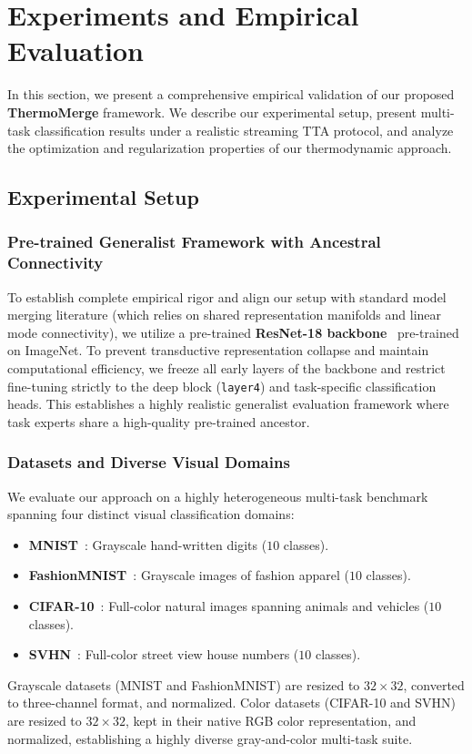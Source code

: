 \section{Experiments and Empirical Evaluation}
\label{sec:experiments}

In this section, we present a comprehensive empirical validation of our proposed \textbf{ThermoMerge} framework. We describe our experimental setup, present multi-task classification results under a realistic streaming TTA protocol, and analyze the optimization and regularization properties of our thermodynamic approach.

\subsection{Experimental Setup}

\subsubsection{Pre-trained Generalist Framework with Ancestral Connectivity}
To establish complete empirical rigor and align our setup with standard model merging literature (which relies on shared representation manifolds and linear mode connectivity), we utilize a pre-trained \textbf{ResNet-18 backbone}~\cite{he2016deep} pre-trained on ImageNet. To prevent transductive representation collapse and maintain computational efficiency, we freeze all early layers of the backbone and restrict fine-tuning strictly to the deep block (\texttt{layer4}) and task-specific classification heads. This establishes a highly realistic generalist evaluation framework where task experts share a high-quality pre-trained ancestor.

\subsubsection{Datasets and Diverse Visual Domains}
We evaluate our approach on a highly heterogeneous multi-task benchmark spanning four distinct visual classification domains:
\begin{itemize}
    \item \textbf{MNIST}~\cite{lecun1998gradient}: Grayscale hand-written digits ($10$ classes).
    \item \textbf{FashionMNIST}~\cite{xiao2017fashion}: Grayscale images of fashion apparel ($10$ classes).
    \item \textbf{CIFAR-10}~\cite{krizhevsky2009learning}: Full-color natural images spanning animals and vehicles ($10$ classes).
    \item \textbf{SVHN}~\cite{netzer2011reading}: Full-color street view house numbers ($10$ classes).
\end{itemize}
Grayscale datasets (MNIST and FashionMNIST) are resized to $32\times32$, converted to three-channel format, and normalized. Color datasets (CIFAR-10 and SVHN) are resized to $32\times32$, kept in their native RGB color representation, and normalized, establishing a highly diverse gray-and-color multi-task suite.


